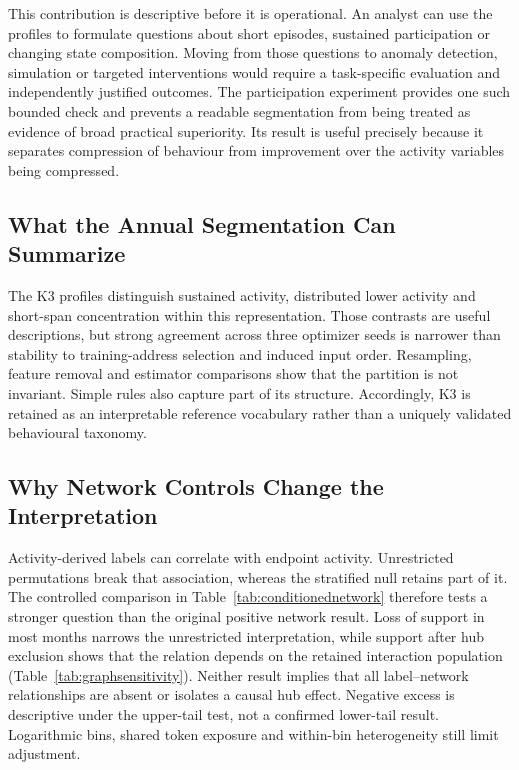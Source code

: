 \documentclass[journal,letterpaper]{IEEEtran}
\begin{document}
This contribution is descriptive before it is operational. An analyst can use the profiles to formulate questions about short episodes, sustained participation or changing state composition. Moving from those questions to anomaly detection, simulation or targeted interventions would require a task-specific evaluation and independently justified outcomes. The participation experiment provides one such bounded check and prevents a readable segmentation from being treated as evidence of broad practical superiority. Its result is useful precisely because it separates compression of behaviour from improvement over the activity variables being compressed.

\subsection{What the Annual Segmentation Can Summarize}
The K3 profiles distinguish sustained activity, distributed lower activity and short-span concentration within this representation. Those contrasts are useful descriptions, but strong agreement across three optimizer seeds is narrower than stability to training-address selection and induced input order. Resampling, feature removal and estimator comparisons show that the partition is not invariant. Simple rules also capture part of its structure. Accordingly, K3 is retained as an interpretable reference vocabulary rather than a uniquely validated behavioural taxonomy.

\subsection{Why Network Controls Change the Interpretation}
Activity-derived labels can correlate with endpoint activity. Unrestricted permutations break that association, whereas the stratified null retains part of it. The controlled comparison in Table~\ref{tab:conditionednetwork} therefore tests a stronger question than the original positive network result. Loss of support in most months narrows the unrestricted interpretation, while support after hub exclusion shows that the relation depends on the retained interaction population (Table~\ref{tab:graphsensitivity}). Neither result implies that all label--network relationships are absent or isolates a causal hub effect. Negative excess is descriptive under the upper-tail test, not a confirmed lower-tail result. Logarithmic bins, shared token exposure and within-bin heterogeneity still limit adjustment.
\end{document}
